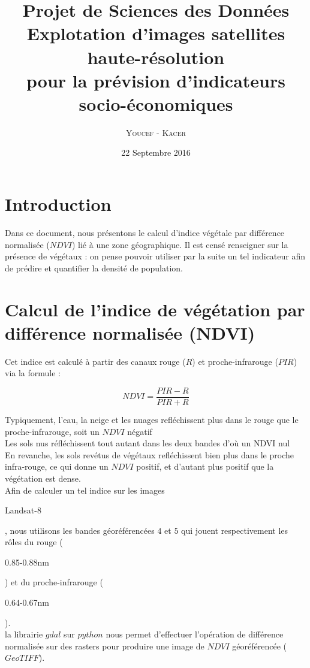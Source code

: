\documentclass{book}
\title{%
  Projet de Sciences des Données \\
  \large Explotation d'images satellites haute-résolution \\pour la prévision d'indicateurs socio-économiques \\
    }
\author{\textsc{Youcef} - \textsc{Kacer}}
\date{22 Septembre 2016}
\begin{document}
 
\maketitle

\tableofcontents

\frontmatter
\chapter{Introduction}
Dans ce document, nous présentons le calcul d'indice végétale par différence normalisée ($NDVI$) lié à une zone géographique. Il est censé renseigner sur la présence de végétaux :
on pense pouvoir utiliser par la suite un tel indicateur afin de prédire et quantifier la densité de population. 

\mainmatter
\chapter{Calcul de l'indice de végétation par différence normalisée (NDVI)}

Cet indice est calculé à partir des canaux
rouge ($R$) et proche-infrarouge ($PIR$) via la formule : 

\[NDVI=\frac{PIR-R}{PIR+R}\]

Typiquement, l'eau, la neige et les nuages refléchissent plus dans le rouge que le proche-infrarouge, soit un $NDVI$ négatif\\
Les sols nus réfléchissent tout autant dans les deux bandes d'où un NDVI nul\\
En revanche, les sols revétus de végétaux refléchissent bien plus dans le proche infra-rouge, ce qui donne un $NDVI$ positif, et d'autant
plus positif que la végétation est dense.\\
Afin de calculer un tel indice sur les images \begin{itshape}Landsat-8\end{itshape}, nous utilisons les bandes géoréférencées $4$ et $5$ 
qui jouent respectivement les r\^oles du rouge (\begin{itshape}0.85-0.88nm\end{itshape}) et du proche-infrarouge (\begin{itshape}0.64-0.67nm\end{itshape}).\\
la librairie $gdal$ sur $python$ nous permet d'effectuer l'opération de différence normalisée sur des rasters pour produire une image de $NDVI$ géoréférencée ($GeoTIFF$).
\end{document}
